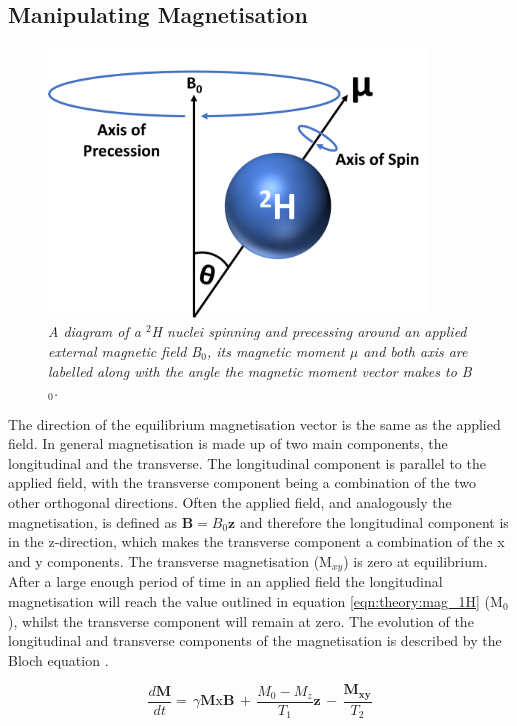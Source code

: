 \subsection{Manipulating Magnetisation}

\begin{figure}
    \centering
    \includegraphics[width=0.9\textwidth]{Figures/Theory/Moment.png}
    \caption{\textit{A diagram of a $^2$H nuclei spinning and precessing around an applied external magnetic field B$_0$, its magnetic moment $\mu$ and both axis are labelled along with the angle the magnetic moment vector makes to B$_0$.}}
    \label{fig:theory:moment}
\end{figure}

The direction of the equilibrium magnetisation vector is the same as the applied field. In general magnetisation is made up of two main components, the longitudinal and the transverse. The longitudinal component is parallel to the applied field, with the transverse component being a combination of the two other orthogonal directions. Often the applied field, and analogously the magnetisation, is defined as $\mathbf{B}=B_0\mathbf{z}$ and therefore the longitudinal component is in the z-direction, which makes the transverse component a combination of the x and y components. The transverse magnetisation (M$_{xy}$) is zero at equilibrium. After a large enough period of time in an applied field the longitudinal magnetisation will reach the value outlined in equation \ref{eqn:theory:mag_1H} (M$_0$), whilst the transverse component will remain at zero. The evolution of the longitudinal and transverse components of the magnetisation is described by the Bloch equation \cite{Bloch1946NuclearInduction}.

\begin{equation}
    \frac{d\mathbf{M}}{dt} = \, \gamma\mathbf{M}\textrm{x}\mathbf{B} \, + \, \frac{M_0-M_z}{T_1}\mathbf{z} \, - \, \frac{\mathbf{M_{xy}}}{T_2}
    \label{eqn:theory:Bloch}
\end{equation}

